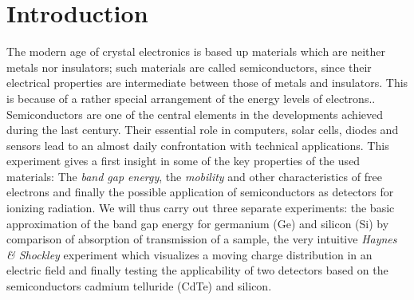 \section{Introduction}
The modern age of crystal electronics is based up materials which are neither
metals nor insulators; such materials are called semiconductors, 
since their electrical properties are
intermediate between those of metals and insulators. 
This is because of a rather special arrangement of
the energy levels of electrons.\cite{phillips2012bonds}. 
Semiconductors are one of the central elements in the developments 
achieved during the last century. Their essential role in computers, 
solar cells, diodes and sensors lead to an almost daily confrontation 
with technical applications. This experiment gives a first insight 
in some of the key properties of the used materials: 
The \emph{band gap energy}, the \emph{mobility} and other characteristics 
of free electrons and finally the possible application 
of semiconductors as detectors for ionizing radiation. 
We will thus carry out three separate experiments: the basic approximation 
of the band gap energy for germanium (Ge) and silicon (Si) by comparison 
of absorption of transmission of a sample, the very intuitive 
\emph{Haynes \& Shockley} experiment 
which visualizes a moving charge distribution in an electric field 
and finally testing the applicability of two detectors based on the 
semiconductors cadmium telluride (CdTe) and silicon.
